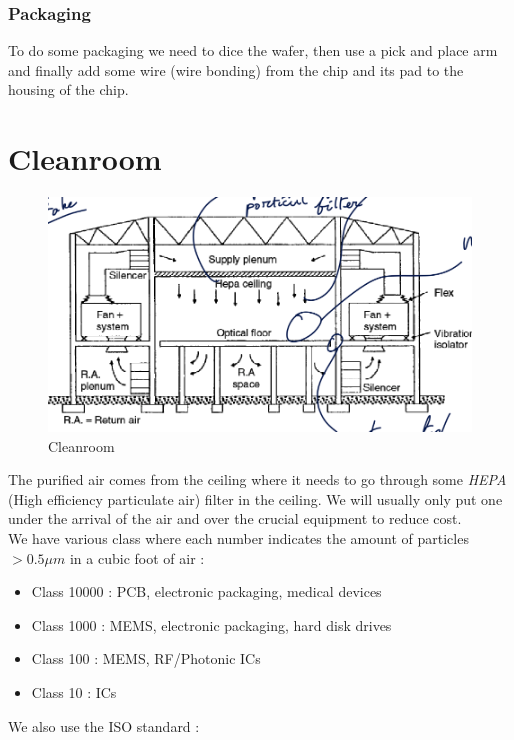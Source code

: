 \documentclass{report}
\begin{document}
\subsubsection{Packaging}

To do some packaging we need to dice the wafer, then use a pick and place arm and finally add some wire (wire bonding) from the chip and its pad to the housing of the chip.


\section{Cleanroom}

\begin{figure}[H]
    \centering
    \includegraphics[width=0.7\linewidth]{cleanroom.png}
    \caption{Cleanroom}
    \label{fig:cleanroom-label}
\end{figure}

The purified air comes from the ceiling where it needs to go through some \textit{HEPA} (High efficiency particulate air) filter in the ceiling. We will usually only put one under the arrival of the air and over the crucial equipment to reduce cost.\\

We have various class where each number indicates the amount of particles $>0.5\mu m$ in a cubic foot of air :

\begin{itemize}
    \item Class 10000 : PCB, electronic packaging, medical devices
    \item Class 1000 : MEMS, electronic packaging, hard disk drives
    \item Class 100 : MEMS, RF/Photonic ICs
    \item Class 10 : ICs
\end{itemize}

We also use the ISO standard : 
\end{document}

